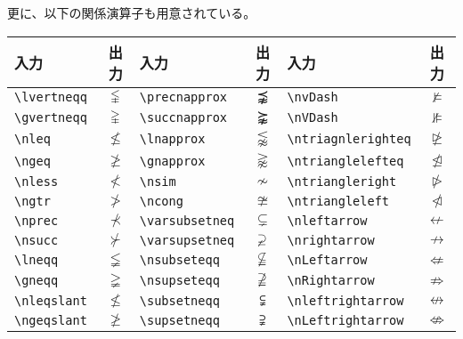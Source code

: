 更に、以下の関係演算子も用意されている。
\begin{longtable}{@{}lclclc@{}}
  入力                      & 出力                 & 入力                        & 出力                   & 入力                     & 出力                \\ \toprule
  \verb`\lvertneqq        ` & $\lvertneqq$         & \verb`\precnapprox        ` & $\precnapprox$         & \verb`\nvDash`           & $\nvDash$           \\
  \verb`\gvertneqq`         & $\gvertneqq$         & \verb`\succnapprox`         & $\succnapprox$         & \verb`\nVDash`           & $\nVDash$           \\
  \verb`\nleq`              & $\nleq$              & \verb`\lnapprox`            & $\lnapprox$            & \verb`\ntriagnlerighteq` & $\ntrianglerighteq$ \\
  \verb`\ngeq`              & $\ngeq$              & \verb`\gnapprox`            & $\gnapprox$            & \verb`\ntrianglelefteq`  & $\ntrianglelefteq$  \\
  \verb`\nless`             & $\nless$             & \verb`\nsim`                & $\nsim$                & \verb`\ntriangleright`   & $\ntriangleright$   \\
  \verb`\ngtr`              & $\ngtr$              & \verb`\ncong`               & $\ncong$               & \verb`\ntriangleleft`    & $\ntriangleleft$    \\
  \verb`\nprec`             & $\nprec$             & \verb`\varsubsetneq`        & $\varsubsetneq$        & \verb`\nleftarrow`       & $\nleftarrow$       \\
  \verb`\nsucc`             & $\nsucc$             & \verb`\varsupsetneq`        & $\varsupsetneq$        & \verb`\nrightarrow`      & $\nrightarrow$      \\
  \verb`\lneqq`             & $\lneqq$             & \verb`\nsubseteqq`          & $\nsubseteqq$          & \verb`\nLeftarrow`       & $\nLeftarrow$       \\
  \verb`\gneqq`             & $\gneqq$             & \verb`\nsupseteqq`          & $\nsupseteqq$          & \verb`\nRightarrow`      & $\nRightarrow$      \\
  \verb`\nleqslant`         & $\nleqslant$         & \verb`\subsetneqq`          & $\subsetneqq$          & \verb`\nleftrightarrow`  & $\nleftrightarrow$  \\
  \verb`\ngeqslant`         & $\ngeqslant$         & \verb`\supsetneqq`          & $\supsetneqq$          & \verb`\nLeftrightarrow`  & $\nLeftrightarrow$  \\

\end{longtable}
